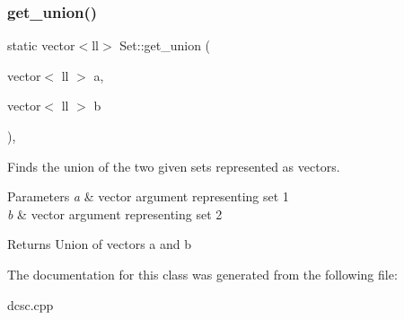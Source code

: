 \subsubsection{\texorpdfstring{get\+\_\+union()}{get\_union()}}
{\footnotesize\ttfamily static vector$<$ll$>$ Set\+::get\+\_\+union (\begin{DoxyParamCaption}\item[{vector$<$ ll $>$}]{a,  }\item[{vector$<$ ll $>$}]{b }\end{DoxyParamCaption})\hspace{0.3cm}{\ttfamily [inline]}, {\ttfamily [static]}}



Finds the union of the two given sets represented as vectors. 


\begin{DoxyParams}{Parameters}
{\em a} & vector argument representing set 1 \\
\hline
{\em b} & vector argument representing set 2 \\
\hline
\end{DoxyParams}
\begin{DoxyReturn}{Returns}
Union of vectors a and b 
\end{DoxyReturn}


The documentation for this class was generated from the following file\+:\begin{DoxyCompactItemize}
\item 
dcsc.\+cpp\end{DoxyCompactItemize}
